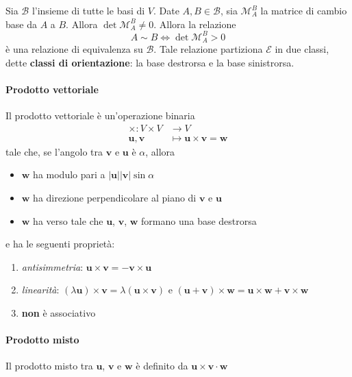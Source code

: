 Sia \(\mathcal{B}\) l'insieme di tutte le basi di \(V\). Date \(A, B \in
\mathcal{B}\), sia \(\mathcal{M}_A^{B}\) la matrice di cambio base da \(A\) a
\(B\). Allora \(\det \mathcal{M}_A^{B} \neq 0\). Allora la relazione 
\[
    A \sim B \iff \det \mathcal{M}_A^{B} > 0
\]
è una relazione di equivalenza su \(\mathcal{B}\). Tale relazione partiziona
\(\mathcal{E}\) in due classi, dette \textbf{classi di orientazione}: la base
destrorsa e la base sinistrorsa.
\paragraph{Prodotto vettoriale} Il prodotto vettoriale è un'operazione binaria 
\begin{align*}
    \times : V \times V &\longrightarrow V \\
    \mathbf{u} , \mathbf{v}  &\longmapsto \mathbf{u} \times  \mathbf{v}=
    \mathbf{w} 
\end{align*}
tale che, se l'angolo tra \(\mathbf{v} \) e \(\mathbf{u}\) è \(\alpha\), allora
\begin{itemize}[label = --]
    \item \(\mathbf{w} \) ha modulo pari a \(|\mathbf{u} | |\mathbf{v} | \sin \alpha\) 
    \item \(\mathbf{w} \) ha direzione perpendicolare al piano di \(\mathbf{v}
        \) e \(\mathbf{u} \) 
    \item \(\mathbf{w} \) ha verso tale che \(\mathbf{u} \), \(\mathbf{v} \),
        \(\mathbf{w} \) formano una base destrorsa
\end{itemize}
e ha le seguenti proprietà:
\begin{enumerate}[label = \arabic*.]
    \item \emph{antisimmetria}: \(\mathbf{u} \times \mathbf{v} = - \mathbf{v}
        \times \mathbf{u}\)
    \item \emph{linearità}: \((\lambda \mathbf{u} ) \times \mathbf{v} = \lambda
        (\mathbf{u} \times \mathbf{v} )\) e \((\mathbf{u} + \mathbf{v} ) \times
        \mathbf{w} = \mathbf{u} \times \mathbf{w} + \mathbf{v} \times \mathbf{w}\)
    \item \textbf{non} è associativo
\end{enumerate}
\paragraph{Prodotto misto} Il prodotto misto tra \(\mathbf{u} \), \(\mathbf{v}
\) e \(\mathbf{w} \) è definito da \(\mathbf{u} \times \mathbf{v} \cdot \mathbf{w} \) 
